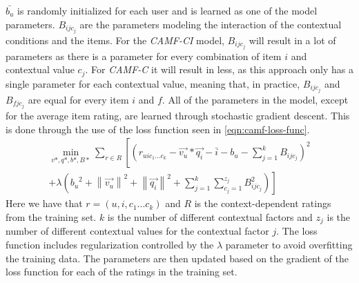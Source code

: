 $\bar{b_u}$ is randomly initialized for each user and is learned as one of the model parameters.
$B_{ijc_j}$ are the parameters modeling the interaction of the contextual conditions and the items.
For the \textit{CAMF-CI} model, $B_{ijc_j}$ will result in a lot of parameters as there is a parameter for every combination of item $i$ and contextual value $c_j$.
For \textit{CAMF-C} it will result in less, as this approach only has a single parameter for each contextual value, meaning that, in practice, $B_{ijc_j}$ and $B_{fjc_j}$ are equal for every item $i$ and $f$.
All of the parameters in the model, except for the average item rating, are learned through stochastic gradient descent.
This is done through the use of the loss function seen in \autoref{eqn:camf-loss-func}.
\begin{equation}
    \label{eqn:camf-loss-func}
    \begin{split}
        \min_{v*, q*, b*, B*}\sum \limits_{r \in  R}\left [ \left (  r_{uic_1...c_k} - \vec{v_u} * \vec{q_i} - \bar{i} - b_u - \sum\limits_{j = 1}^k B_{ijc_j}\right )^2 \right. \\
        \left. + \lambda \left({b_u}^2 +{\left \| \vec{v_u} \right \|}^2  + {\left \|\vec{q_i}  \right \|}^2 + \sum\limits_{j = 1}^k \sum\limits_{c_j = 1}^{z_j} B_{ijc_j}^{2}\right ) \right ]
    \end{split}
\end{equation}
Here we have that $r = (u,i,c_1...c_k)$ and $R$ is the context-dependent ratings from the training set.
$k$ is the number of different contextual factors and $z_j$ is the number of different contextual values for the contextual factor $j$.
The loss function includes regularization controlled by the $\lambda$ parameter to avoid overfitting the training data.
The parameters are then updated based on the gradient of the loss function for each of the ratings in the training set.
